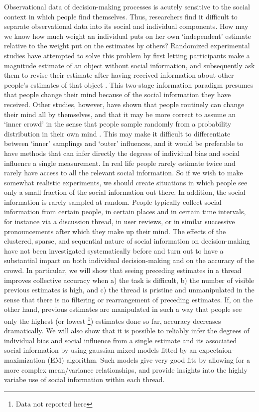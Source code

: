 \documentclass[10pt,a4paper,twocolumn,lineno]{article}
\begin{document}
Observational data of decision-making processes is acutely sensitive to the social context in which people find themselves. Thus, researchers find it difficult to separate observational data into its social and individual components. How may we know how much weight an individual puts on her own ‘independent’ estimate relative to the weight put on the estimates by others? Randomized experimental studies have attempted to solve this problem by first letting participants make a magnitude estimate of an object without social information, and subsequently ask them to revise their estimate after having received information about other people’s estimates of that object \cite{becker2017network, jayles2017social, lorenz2011social, sniezek1995cueing, mavrodiev2013quantifying}. This two-stage information paradigm presumes that people change their mind because of the social information they have received. Other studies, however, have shown that people routinely can change their mind all by themselves, and that it may be more correct to assume an `inner crowd' in the sense that people sample randomly from a probability distribution in their own mind \cite{vul2008measuring, herzog2009wisdom, herzog2014harnessing}. This may make it difficult to differentiate between `inner' samplings and `outer' influences, and it would be preferable to have methods that can infer directly the degrees of individual bias and social influence a single measurement. In real life people rarely estimate twice and rarely have access to all the relevant social information. So if we wish to make somewhat realistic experiments, we should create situations in which people see only a small fraction of the social information out there. In addition, the social information is rarely sampled at random. People typically collect social information from certain people, in certain places and in certain time intervals, for instance via a discussion thread, in user reviews, or in similar successive pronouncements after which they make up their mind. The effects of the clustered, sparse, and sequential nature of social information on decision-making have not been investigated systematically before and turn out to have a substantial impact on both individual decision-making and on the accuracy of the crowd. In particular, we will show that seeing preceding estimates in a thread improves collective accuracy when a) the task is difficult, b) the number of visible previous estimates is high, and c) the thread is pristine and unmanipulated in the sense that there is no filtering or rearrangement of preceding estimates. If, on the other hand, previous estimates are manipulated in such a way that people see only the highest (or lowest \footnote{Data not reported here}) estimates done so far, accuracy decreases dramatically. We will also show that it is possible to reliably infer the degrees of individual bias and social influence from a single estimate and its associated social information by using gaussian mixed models fitted by an expectaion-maximization (EM) algorithm. Such models give very good fits by allowing for a more complex mean/variance relationships, and provide insights into the highly variabe use of social information within each thread.
	
\end{document}
